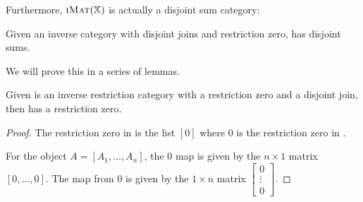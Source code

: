 Furthermore, $\textsc{iMat}({\mathbb{X}})$ is actually a disjoint sum category:
\begin{theorem}\label{thm:imatx_is_an_disjoint_sum_category}
  Given \X an inverse category with disjoint joins and restriction zero, \imatx has
  disjoint sums.
\end{theorem}

We will prove this in a series of lemmas.

\begin{lemma}\label{lem:imat_has_restriction_zero}
  Given \X is an inverse restriction category with a restriction zero and a disjoint join,
  then \imatx has a restriction zero.
\end{lemma}
\begin{proof}
  The restriction zero in \imatx is the list $[0]$ where $0$ is the restriction zero in \X.

  For the object $A=[A_1,\ldots,A_n]$, the $0$ map is given by the $n\times 1$ matrix
  $[0,\ldots,0]$. The map from $0$ is given by the $1\times n$ matrix
  $\begin{bmatrix}0\\ \vdots\\ 0\end{bmatrix}$.

\end{proof}

